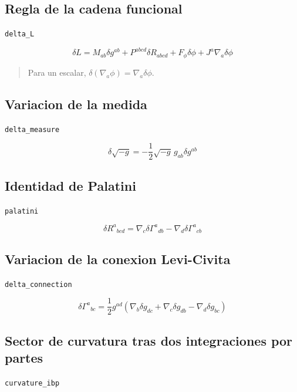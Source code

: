 \documentclass[11pt,a4paper]{article}
\begin{document}
\subsection{Regla de la cadena funcional}

\noindent\texttt{delta\_L}\par\nopagebreak[4]

\[
\delta L = M_{ab}\delta g^{ab}+P^{abcd}\delta R_{abcd}+F_\phi\delta\phi+J^a\nabla_a\delta\phi
\]

\begin{quote}\small Para un escalar, \(\delta(\nabla_a\phi)=\nabla_a\delta\phi\).\end{quote}

\subsection{Variacion de la medida}

\noindent\texttt{delta\_measure}\par\nopagebreak[4]

\[
\delta\sqrt{-g} = -\frac12\sqrt{-g}\,g_{ab}\delta g^{ab}
\]

\subsection{Identidad de Palatini}

\noindent\texttt{palatini}\par\nopagebreak[4]

\[
\delta R^a{}_{bcd} = \nabla_c\delta\Gamma^a{}_{db}-\nabla_d\delta\Gamma^a{}_{cb}
\]

\subsection{Variacion de la conexion Levi-Civita}

\noindent\texttt{delta\_connection}\par\nopagebreak[4]

\[
\delta\Gamma^a{}_{bc} = \frac12g^{ad}(\nabla_b\delta g_{dc}+\nabla_c\delta g_{db}-\nabla_d\delta g_{bc})
\]

\subsection{Sector de curvatura tras dos integraciones por partes}

\noindent\texttt{curvature\_ibp}\par\nopagebreak[4]
\end{document}
